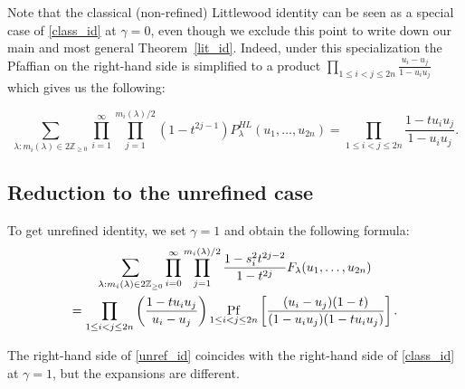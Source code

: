 \documentclass[ALCO,Unicode]{cedram}
\newcommand{\pf}{\mathop{\rm Pf}}
\begin{document}
Note that the classical (non-refined) Littlewood identity can be seen as a special case of \eqref{class_id} at $\gamma = 0$, even though we exclude this point to write down our main and most general Theorem~\ref{lit_id}. Indeed, under this specialization the Pfaffian on the right-hand side is simplified to a product 
$\prod_{1 \leq i<j \leq 2n} \frac{ u_i - u_j}
{1-u_i u_j}$ which gives us the following:

\begin{equation*}
\sum_{\lambda: m_{i}(\lambda) \in 2 \mathbb{Z}_{\geq 0}}  \prod_{i = 1}^{\infty} \prod_{j = 1}^{m_{i}(\lambda) / 2} (1 - t^{2j-1}) P_{\lambda}^{HL} (u_1,\ldots,u_{2n})
=
\prod_{1 \leq i<j \leq 2n}
\frac{1-t u_i u_j}{1 - u_i u_j} .
\end{equation*}

\subsection{Reduction to the unrefined case}
To get unrefined identity, we set $\gamma = 1$ and obtain the following formula:
\begin{multline} \label{unref_id}
\sum_{\lambda: m_{i}(\lambda) \in 2 \mathbb{Z}_{\geq 0}}   \prod_{i = 0}^{\infty} \prod_{j = 1}^{m_{i}(\lambda) / 2} \frac{1 - s_{i}^2 t^{2j - 2}}{1 - t^{2j}} F_{\lambda} (u_1, \dots, u_{2n})
\\
=
\prod_{1 \leq i<j \leq 2n}
\left(
\frac{1-t u_i u_j}{u_i - u_j}
\right) 
\pf_{1\leq i < j \leq 2n}
\left[
\frac{ (u_i - u_j)(1 - t) }
{(1-u_i u_j) (1-t u_i u_j)}
\right].
\end{multline}

The right-hand side of \eqref{unref_id} coincides with the right-hand side of \eqref{class_id} at $\gamma = 1$, but the expansions are different.




\end{document}
